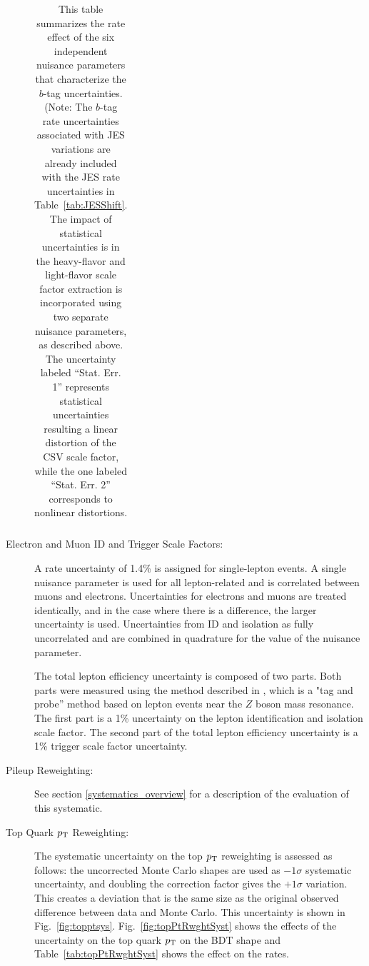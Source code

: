 \begin{description}
\begin{table}[hbtp]
\begin{tabular}{|c|c|c|c|c|}
   \end{tabular} 
   \caption{This table summarizes the rate effect of the six independent nuisance parameters that characterize the $b$-tag uncertainties.  (Note:  The $b$-tag rate uncertainties associated with JES variations are already included with the JES rate uncertainties in Table~\ref{tab:JESShift}.  The impact of statistical uncertainties is in the heavy-flavor and light-flavor scale factor extraction is incorporated using two separate nuisance parameters, as described above.  The uncertainty labeled ``Stat. Err. 1'' represents statistical uncertainties resulting a linear distortion of the CSV scale factor, while the one labeled ``Stat. Err. 2'' corresponds to nonlinear distortions.}
   \label{tab:CSVRates}
 \end{table} 


\item[Electron and Muon ID and Trigger Scale Factors:] A rate uncertainty of
 1.4\%  is assigned for single-lepton events. A single nuisance
 parameter is used for all lepton-related and is correlated between muons and electrons.
 Uncertainties for electrons and muons are treated identically, and in
 the case where there is a difference, the larger uncertainty is
 used.  Uncertainties from ID and isolation as fully uncorrelated and
 are combined in quadrature for the value of the nuisance
 parameter. 

  The total lepton efficiency uncertainty is composed of two
  parts. Both parts were measured using the method described in
  \cite{CMS-AN-12-389}, which is a "tag and probe'' method based on
  lepton events near the $Z$ boson mass resonance. The first part is a
  1\% uncertainty on the lepton identification and isolation scale
  factor. The second part of the total lepton efficiency uncertainty
  is a 1\% trigger scale factor uncertainty. 

  \item[Pileup Reweighting:]  See section \ref{systematics_overview}
  for a description of the evaluation of this systematic.  

\item[Top Quark $p_{\mathrm{T}}$ Reweighting:] The systematic uncertainty on the
  top $p_{\mathrm{T}}$ reweighting is assessed as follows: the uncorrected
  Monte Carlo shapes are used as $-1\sigma$ systematic uncertainty,
  and doubling the correction factor gives the $+1\sigma$ variation.
  This creates a deviation that is the same size as the original
  observed difference between data and Monte Carlo.  This uncertainty
  is shown in Fig.~\ref{fig:topptsys}.  Fig.~\ref{fig:topPtRwghtSyst}
  shows the effects of the uncertainty on the top quark $p_{\mathrm{T}}$ on the
  BDT shape and Table~\ref{tab:topPtRwghtSyst} shows the effect on the rates.


\end{description}
